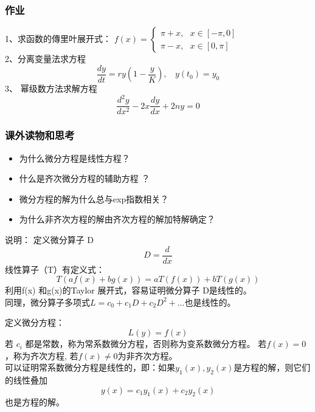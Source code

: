
\begin{frame}
\frametitle{作业 }
	1、求函数的傳里叶展开式：
	$\displaystyle f(x)=\begin{cases}
		\pi +x , ~~~ x \in [-\pi, 0] \\
		\pi -x ,~~~ x \in   [0, \pi] 
	\end{cases}$ \\
	2、分离变量法求方程\\
	\begin{equation*}
		\frac{dy}{dt}	=  r y (1-\frac{y}{K}), ~~~~ y(t_0) = y_0
	\end{equation*}
	3、	幂级数方法求解方程\\
	\begin{equation*}
		\frac{d^2 y}{d x^2} -2x \frac{d y}{d x} +2n y =0 
	\end{equation*}     
\end{frame}

\begin{frame}
	\frametitle{课外读物和思考}
	\begin{itemize}
		\item 为什么微分方程是线性方程？
		\item 什么是齐次微分方程的辅助方程 ？
		\item 微分方程的解为什么总与exp指数相关？ 
		\item 为什么非齐次方程的解由齐次方程的解加特解确定？
	\end{itemize}	
\end{frame}

\begin{frame}
	\alert{说明：} 	定义微分算子 D
	\begin{equation*}
		D= \dfrac{d}{dx}
	\end{equation*}	
	线性算子（T）有定义式：
	\begin{equation*}
		T(a f(x) +b g(x) )  =a T(f(x)) +b T(g(x)) 
   \end{equation*}	
 	利用f(x) 和g(x)的Taylor 展开式，容易证明微分算子 D是线性的。\\ \vspace{0.3em}
	同理，微分算子多项式$	L= c_0 + c_1D +c_2D^2 +...  $也是线性的。\\
\end{frame}

\begin{frame}
    定义微分方程：
    \begin{equation*}
    	L(y)=f(x)
    \end{equation*}
    若{ $c_i$} 都是常数，称为常系数微分方程，否则称为变系数微分方程。 若$f(x)=0$，称为齐次方程, 若$f(x)\ne0$为非齐次方程。\\ 
	可以证明常系数微分方程是线性的，即：如果$y_1(x) ,  y_2(x) $是方程的解，则它们的线性叠加
    \begin{equation*}
    	y(x)=c_1y_1(x) +c_2y_2(x) 
    \end{equation*}	
    也是方程的解。
\end{frame}


